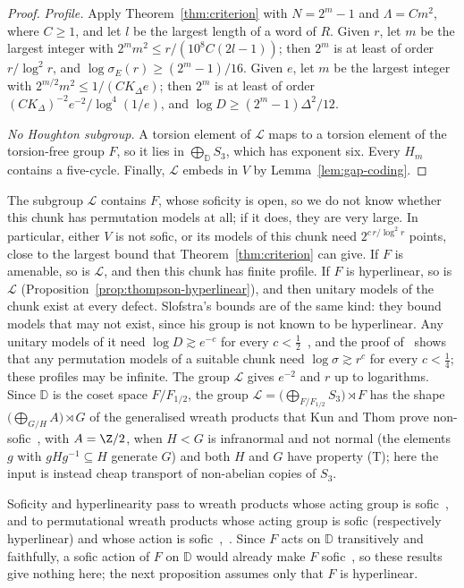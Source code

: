 \begin{proof}
\emph{Profile.} Apply Theorem~\ref{thm:criterion} with $N=2^m-1$ and $\Lambda=Cm^2$, where $C\ge1$, and let $l$ be the largest
length of a word of $R$. Given $r$, let $m$ be the largest
integer with $2^mm^2\le r/(10^8C(2l-1))$; then $2^m$ is at least of order $r/\log^2r$, and $\log\sigma_E(r)\ge(2^m-1)/16$. Given
$e$, let $m$ be the largest integer with $2^{m/2}m^2\le1/(CK_\Delta e)$; then $2^m$ is at least of order
$(CK_\Delta)^{-2}e^{-2}/\log^4(1/e)$, and $\log D\ge(2^m-1)\Delta^2/12$.

\emph{No Houghton subgroup.} A torsion element of $\mathcal L$ maps to a torsion element of the torsion-free group $F$, so it lies in
$\bigoplus_{\mathbb D}S_3$, which has exponent six. Every $H_m$ contains a five-cycle. Finally, $\mathcal L$ embeds in $V$ by
Lemma~\ref{lem:gap-coding}.
\end{proof}

The subgroup $\mathcal L$ contains $F$, whose soficity is open, so we do not know whether this chunk has permutation models at all; if it
does, they are very large. In particular, either $V$ is not sofic, or its models of this chunk need $2^{c\,r/\log^2r}$ points, close to the
largest bound that Theorem~\ref{thm:criterion} can give. If $F$ is amenable, so is $\mathcal L$, and then this chunk has finite profile. If $F$ is
hyperlinear, so is $\mathcal L$ (Proposition~\ref{prop:thompson-hyperlinear}), and then unitary models of the chunk exist at every defect.
Slofstra's bounds are of the same kind: they bound models that may not exist, since his group is not known to be hyperlinear. Any unitary
models of it need $\log D\gtrsim e^{-c}$ for every $c<\frac12$~\cite[Theorem~1.2 and the remark after it]{Slofstra2018}, and the proof
of~\cite[Corollary~1.3]{Slofstra2018} shows that any permutation models of a suitable chunk need $\log\sigma\gtrsim r^c$ for every $c<\frac14$;
these profiles may be infinite. The group $\mathcal L$ gives $e^{-2}$ and $r$ up to logarithms. Since $\mathbb D$ is the coset space
$F/F_{1/2}$, the group $\mathcal L=\bigl(\bigoplus_{F/F_{1/2}}S_3\bigr)\rtimes F$ has the shape $\bigl(\bigoplus_{G/H}A\bigr)\rtimes G$ of the
generalised wreath products that Kun and Thom prove non-sofic~\cite[Theorem~A]{KunThom2026}, with $A=\Z/2$, when $H<G$ is infranormal and not
normal (the elements $g$ with $gHg^{-1}\subseteq H$ generate $G$) and both $H$ and $G$ have property (T); here the input is instead cheap
transport of non-abelian copies of $S_3$.

Soficity and hyperlinearity pass to wreath products whose acting group is sofic~\cite{HayesSale2018}, and to permutational wreath products
whose acting group is sofic (respectively hyperlinear) and whose action is sofic~\cite[Theorems~3.6 and~3.8]{GKEP2025},~\cite{AlekseevBradford2026}.
Since $F$ acts on $\mathbb D$ transitively and faithfully, a sofic action of $F$ on $\mathbb D$ would already make $F$
sofic~\cite[Theorem~2.12]{GKEP2025}, so these results give nothing here; the next proposition assumes only that $F$ is hyperlinear.

